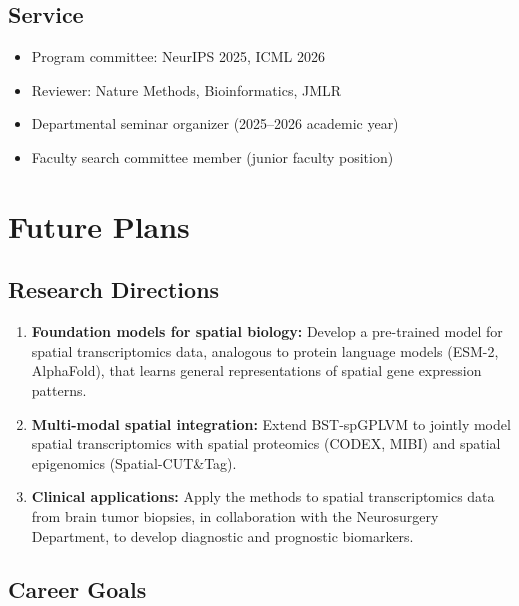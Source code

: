 \documentclass[
    language=english,
    doctype=postdoc-report,
    institution=none,
]{../../omnilatex}
\begin{document}
\subsection{Service}

\begin{itemize}
    \item Program committee: NeurIPS 2025, ICML 2026
    \item Reviewer: Nature Methods, Bioinformatics, JMLR
    \item Departmental seminar organizer (2025--2026 academic year)
    \item Faculty search committee member (junior faculty position)
\end{itemize}

\section{Future Plans}
\label{sec:future}

\subsection{Research Directions}

\begin{enumerate}
    \item \textbf{Foundation models for spatial biology:} Develop a
          pre-trained model for spatial transcriptomics data, analogous
          to protein language models (ESM-2, AlphaFold), that learns
          general representations of spatial gene expression patterns.

    \item \textbf{Multi-modal spatial integration:} Extend BST-spGPLVM
          to jointly model spatial transcriptomics with spatial proteomics
          (CODEX, MIBI) and spatial epigenomics (Spatial-CUT&Tag).

    \item \textbf{Clinical applications:} Apply the methods to spatial
          transcriptomics data from brain tumor biopsies, in collaboration
          with the Neurosurgery Department, to develop diagnostic and
          prognostic biomarkers.
\end{enumerate}

\subsection{Career Goals}
\end{document}
